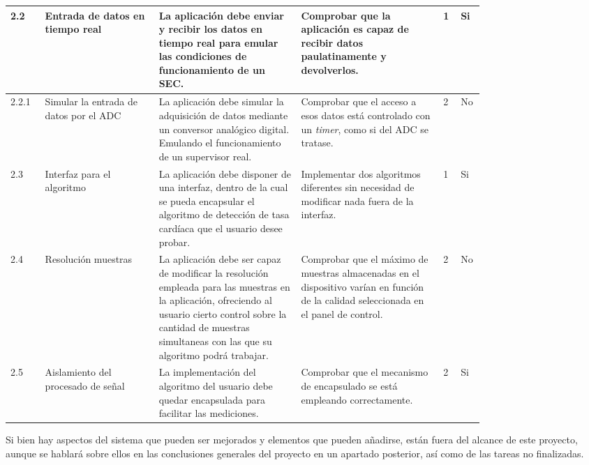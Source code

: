 \begin{scriptsize}
\begin{longtable}{|p{0.05\linewidth}|p{0.20\linewidth}|p{0.25\linewidth}|p{0.25\linewidth}|p{0.02\linewidth}|p{0.02\linewidth}|}
        2.2     & Entrada de datos en tiempo real & La aplicación debe enviar y recibir los datos en tiempo real para emular las condiciones de funcionamiento de un SEC. & Comprobar que la aplicación es capaz de recibir datos paulatinamente y devolverlos. & 1 & Si\\ \hline
        2.2.1   & Simular la entrada de datos por el ADC & La aplicación debe simular la adquisición de datos mediante un conversor analógico digital. Emulando el funcionamiento de un supervisor real. & Comprobar que el acceso a esos datos está controlado con un \textit{timer}, como si del ADC se tratase. & 2 & No\\ \hline
        2.3     & Interfaz para el algoritmo & La aplicación debe disponer de una interfaz, dentro de la cual se pueda encapsular el algoritmo de detección de tasa cardíaca que el usuario desee probar. & Implementar dos algoritmos diferentes sin necesidad de modificar nada fuera de la interfaz. & 1 & Si\\ \hline
        2.4     & Resolución muestras & La aplicación debe ser capaz de modificar la resolución empleada para las muestras en la aplicación, ofreciendo al usuario cierto control sobre la cantidad de muestras simultaneas con las que su algoritmo podrá trabajar. & Comprobar que el máximo de muestras almacenadas en el dispositivo varían en función de la calidad seleccionada en el panel de control. & 2 & No\\ \hline
        2.5 & Aislamiento del procesado de señal & La implementación del algoritmo del usuario debe quedar encapsulada para facilitar las mediciones.  & Comprobar que el mecanismo de encapsulado se está empleando correctamente.  & 2 & Si \\ \hline 
    \end{longtable}   
    \end{scriptsize}
    
    Si bien hay aspectos del sistema que pueden ser mejorados y elementos que pueden añadirse, están fuera del alcance de este proyecto, aunque se hablará sobre ellos en las conclusiones generales del proyecto en un apartado posterior, así como de las tareas no finalizadas.